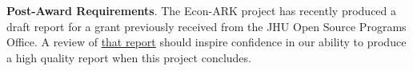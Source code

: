 \documentclass[11pt,pdftex,letterpaper]{article}
\begin{document}
\textbf{Post-Award Requirements}.  The Econ-ARK project has recently produced a draft report for a grant previously received from the JHU Open Source Programs Office.  A review of \href{https://econ-ark.github.io/FOSSProF/}{that report} should inspire confidence in our ability to produce a high quality report when this project concludes. 



\nocite{HARK}
\pagebreak\newpage




\newpage

\begin{singlespace}
    
	
\end{singlespace}
\end{document}
